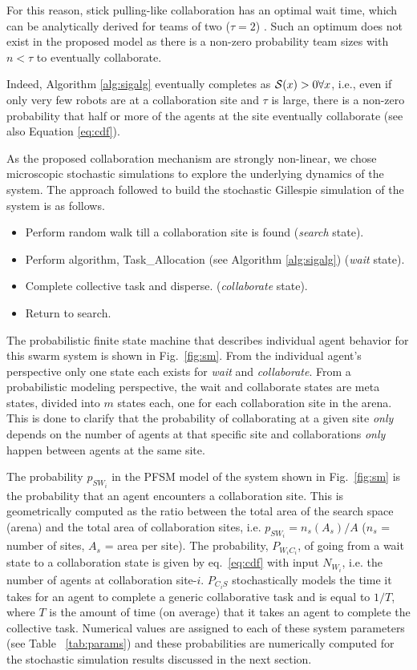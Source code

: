 \documentclass[Main.tex]{subfiles}
\begin{document}
For this reason, stick pulling-like collaboration \cite{Lerman2001} has an optimal wait time, which can be analytically derived for teams of two ($\tau=2$) \cite{Martinoli2004}. Such an optimum does not exist in the proposed model as there is a non-zero probability team sizes with $n<\tau$ to eventually collaborate. 

Indeed, Algorithm \ref{alg:sigalg} eventually completes as $\mathcal{S}(x) > 0 \forall x$, i.e., even if only very few robots are at a collaboration site and $\tau$ is large, there is a non-zero probability that half or more of the agents at the site eventually collaborate (see also Equation \ref{eq:cdf}).




As the proposed collaboration mechanism are strongly non-linear, we chose microscopic stochastic simulations to explore the underlying dynamics of the system. The approach followed to build the stochastic Gillespie simulation of the system is as follows.
\begin{itemize}
\item Perform random walk till a collaboration site is found (\emph{search} state).
\item Perform algorithm, Task\_Allocation (see Algorithm \ref{alg:sigalg}) (\emph{wait} state).
\item Complete collective task and disperse. (\emph{collaborate} state).
\item Return to search.
\end{itemize}

The probabilistic finite state machine that describes individual agent behavior for this swarm system is shown in Fig.~\ref{fig:sm}. From the individual agent's perspective only one state each exists for \emph{wait} and \emph{collaborate}. From a probabilistic modeling perspective, the wait and collaborate states are meta states, divided into $m$ states each, one for each collaboration site in the arena. This is done to clarify that the probability of collaborating at a given site \emph{only} depends on the number of agents at that specific site and collaborations \emph{only} happen between agents at the same site.

The probability $p_{SW_i}$ in the PFSM model of the system shown in Fig.~\ref{fig:sm} is the probability that an agent encounters a collaboration site. This is geometrically computed as the ratio between the total area of the search space (arena) and the total area of collaboration sites, i.e. $p_{SW_i} = n_s(A_s)/A$ ($n_s$ = number of sites, $A_s$ = area per site). The probability, $P_{W_iC_i}$, of going from a wait state to a collaboration state is given by eq.~\eqref{eq:cdf} with input $N_{W_i}$, i.e. the number of agents at collaboration site-$i$. $P_{C_iS}$ stochastically models the time it takes for an agent to complete a generic collaborative task and is equal to $1/T$, where $T$ is the amount of time (on average) that it takes an agent to complete the collective task. Numerical values are assigned to each of these system parameters (see Table ~\ref{tab:params}) and these probabilities are numerically computed for the stochastic simulation results discussed in the next section.
\end{document}
